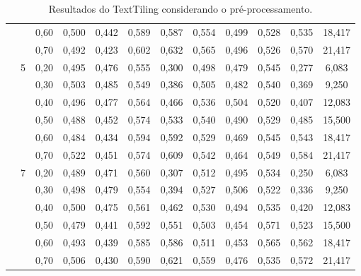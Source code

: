 \documentclass{article}
\begin{document}
\begin{table}[!h]
\begin{tabular}{|c|c|c||c|c|c|c||c|c|c|c||c|}
	 && 0,60    & 0,500 & 0,442 & 0,589 & 0,587         &     0,554 &  0,499 & 0,528 & 0,535 & 18,417              \\ \cline{3-12}  
	 && 0,70    & 0,492 & 0,423 & 0,602 & 0,632         &     0,565 &  0,496 & 0,526 & 0,570 & 21,417              \\ \cline{2-12}  
& \multirow{6}{*}{5}                                                                                                                
	  & 0,20    & 0,495 & 0,476 & 0,555 & 0,300         &     0,498 &  0,479 & 0,545 & 0,277 & 6,083               \\ \cline{3-12}  
	 && 0,30    & 0,503 & 0,485 & 0,549 & 0,386         &     0,505 &  0,482 & 0,540 & 0,369 & 9,250               \\ \cline{3-12}  
	 && 0,40    & 0,496 & 0,477 & 0,564 & 0,466         &     0,536 &  0,504 & 0,520 & 0,407 & 12,083              \\ \cline{3-12}  
	 && 0,50    & 0,488 & 0,452 & 0,574 & 0,533         &     0,540 &  0,490 & 0,529 & 0,485 & 15,500              \\ \cline{3-12}  
	 && 0,60    & 0,484 & 0,434 & 0,594 & 0,592         &     0,529 &  0,469 & 0,545 & 0,543 & 18,417              \\ \cline{3-12}  
	 && 0,70    & 0,522 & 0,451 & 0,574 & 0,609         &     0,542 &  0,464 & 0,549 & 0,584 & 21,417              \\ \cline{2-12}  
& \multirow{6}{*}{7}                                                                                                                
	  & 0,20    & 0,489 & 0,471 & 0,560 & 0,307         &     0,512 &  0,495 & 0,534 & 0,250 & 6,083               \\ \cline{3-12}  
	 && 0,30    & 0,498 & 0,479 & 0,554 & 0,394         &     0,527 &  0,506 & 0,522 & 0,336 & 9,250               \\ \cline{3-12}  
	 && 0,40    & 0,500 & 0,475 & 0,561 & 0,462         &     0,530 &  0,494 & 0,535 & 0,420 & 12,083              \\ \cline{3-12}  
	 && 0,50    & 0,479 & 0,441 & 0,592 & 0,551         &     0,503 &  0,454 & 0,571 & 0,523 & 15,500              \\ \cline{3-12}  
	 && 0,60    & 0,493 & 0,439 & 0,585 & 0,586         &     0,511 &  0,453 & 0,565 & 0,562 & 18,417              \\ \cline{3-12}  
	 && 0,70    & 0,506 & 0,430 & 0,590 & 0,621         &     0,559 &  0,476 & 0,535 & 0,572 & 21,417              \\ \hline      
 \end{tabular}  
\caption{Resultados do TextTiling considerando o pré-processamento.}
\end{table} 
\end{document}
